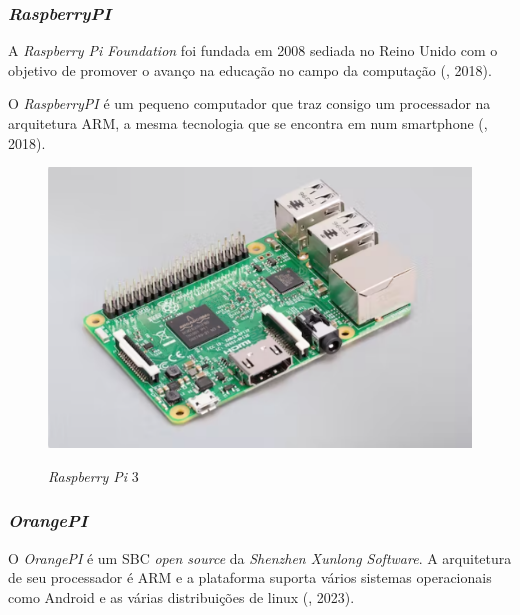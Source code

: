 \subsubsection{\textit{RaspberryPI}}

A \textit{Raspberry Pi Foundation} foi fundada em 2008 sediada no Reino Unido com o objetivo de promover o avanço na educação no campo da computação (\textit{\citeauthor{rasp}}, 2018).

O \textit{RaspberryPI} é um pequeno computador que traz consigo um processador na arquitetura ARM, a mesma tecnologia que se encontra em num smartphone (\textit{\citeauthor{rasp}}, 2018).

\begin{figure}[!htbp]
  \caption{\textit{Raspberry Pi} 3}
  \includegraphics[scale=0.4]{images/rasp.png}
  \label{figura:rasp}
\end{figure}

\subsubsection{\textit{OrangePI}}

O \textit{OrangePI} é um SBC \textit{open source} da \textit{Shenzhen Xunlong Software}. A arquitetura de seu processador é ARM e a plataforma suporta vários sistemas operacionais como Android e as várias distribuições de linux (\textit{\citeauthor{orangepi}}, 2023).

